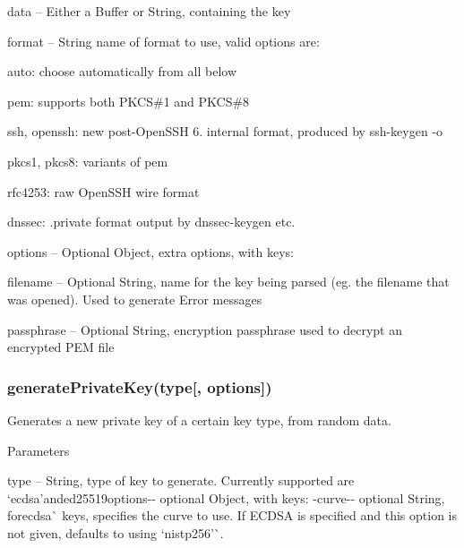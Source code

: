 \begin{DoxyItemize}
\item {\ttfamily data} -- Either a Buffer or String, containing the key
\item {\ttfamily format} -- String name of format to use, valid options are\+:
\begin{DoxyItemize}
\item {\ttfamily auto}\+: choose automatically from all below
\item {\ttfamily pem}\+: supports both P\+K\+CS\#1 and P\+K\+CS\#8
\item {\ttfamily ssh}, {\ttfamily openssh}\+: new post-\/\+Open\+S\+SH 6. internal format, produced by {\ttfamily ssh-\/keygen -\/o}
\item {\ttfamily pkcs1}, {\ttfamily pkcs8}\+: variants of {\ttfamily pem}
\item {\ttfamily rfc4253}\+: raw Open\+S\+SH wire format
\item {\ttfamily dnssec}\+: {\ttfamily .private} format output by {\ttfamily dnssec-\/keygen} etc.
\end{DoxyItemize}
\item {\ttfamily options} -- Optional Object, extra options, with keys\+:
\begin{DoxyItemize}
\item {\ttfamily filename} -- Optional String, name for the key being parsed (eg. the filename that was opened). Used to generate Error messages
\item {\ttfamily passphrase} -- Optional String, encryption passphrase used to decrypt an encrypted P\+EM file
\end{DoxyItemize}
\end{DoxyItemize}

\subsubsection*{{\ttfamily generate\+Private\+Key(type\mbox{[}, options\mbox{]})}}

Generates a new private key of a certain key type, from random data.

Parameters


\begin{DoxyItemize}
\item {\ttfamily type} -- String, type of key to generate. Currently supported are `\textquotesingle{}ecdsa'{\ttfamily  and}\textquotesingle{}ed25519\textquotesingle{}{\ttfamily  -\/}options{\ttfamily -\/-\/ optional Object, with keys\+: -\/}curve{\ttfamily -\/-\/ optional String, for}\textquotesingle{}ecdsa\textquotesingle{}\`{} keys, specifies the curve to use. If E\+C\+D\+SA is specified and this option is not given, defaults to using `\textquotesingle{}nistp256'\`{}.
\end{DoxyItemize}


